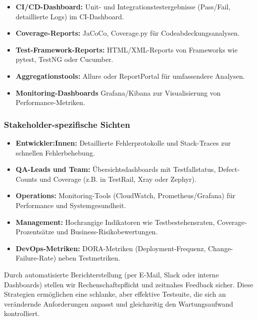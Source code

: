 \begin{itemize}
    \item \textbf{CI/CD-Dashboard:} Unit- und Integrationstestergebnisse
    (Pass/Fail, detaillierte Logs) im CI-Dashboard.
    \item \textbf{Coverage-Reports:} JaCoCo, Coverage.py für Codeabdeckungsanalysen.
    \item \textbf{Test-Framework-Reports:} HTML/XML-Reports von Frameworks wie pytest, TestNG
    oder Cucumber.
    \item \textbf{Aggregationstools:} Allure oder ReportPortal für umfassendere Analysen.
    \item \textbf{Monitoring-Dashboards} Grafana/Kibana zur Visualisierung von Performance-Metriken.
\end{itemize}

\subsubsection{Stakeholder-spezifische Sichten}

\begin{itemize}
    \item \textbf{Entwickler:Innen:} Detaillierte Fehlerprotokolle und Stack-Traces zur schnellen
    Fehlerbehebung.
    \item \textbf{QA-Leads und Team:} Übersichtsdashboards mit Testfallstatus, Defect-Counts und
    Coverage (z.B. in TestRail, Xray oder Zephyr).
    \item \textbf{Operations:} Monitoring-Tools (CloudWatch, Prometheus/Grafana) für Performance
    und Systemgesundheit.
    \item \textbf{Management:} Hochrangige Indikatoren wie Testbestehensraten, Coverage-Prozentsätze
    und Business-Risikobewertungen.
    \item \textbf{DevOps-Metriken:} DORA-Metriken (Deployment-Frequenz, Change-Failure-Rate) neben
    Testmetriken.
\end{itemize}

Durch automatisierte Berichterstellung (per E-Mail, Slack oder interne Dashboards) stellen wir
Rechenschaftspflicht und zeitnahes Feedback sicher.
Diese Strategien ermöglichen eine schlanke, aber effektive Testsuite, die sich an verändernde
Anforderungen anpasst und gleichzeitig den Wartungsaufwand kontrolliert.

